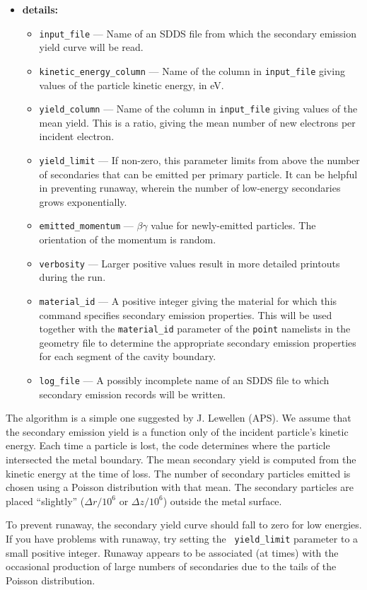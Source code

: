 \begin{itemize}
\item {\bf details:} 
\begin{itemize}
        \item {\tt input\_file} --- Name of an SDDS file from which the secondary emission
        yield curve will be read.
        \item {\tt kinetic\_energy\_column} --- Name of the column in {\tt input\_file} giving
        values of the particle kinetic energy, in eV.  
        \item {\tt yield\_column}  --- Name of the column in {\tt input\_file} giving
        values of the mean yield.  This is a ratio, giving the mean number of new electrons per
        incident electron.
        \item {\tt yield\_limit} --- If non-zero, this parameter limits from above the number
        of secondaries that can be emitted per primary particle. It can be helpful in preventing
        runaway, wherein the number of low-energy secondaries grows exponentially.
        \item {\tt emitted\_momentum} --- $\beta\gamma$ value for newly-emitted particles.
        The orientation of the momentum is random.
        \item {\tt verbosity} --- Larger positive values result in more detailed printouts
        during the run.
        \item {\tt material\_id} --- A positive integer giving the material for which this
          command specifies secondary emission properties. This will be used together with
          the \verb|material_id| parameter of the \verb|point| namelists in the geometry
          file to determine the appropriate secondary emission properties for each segment
          of the cavity boundary.
        \item {\tt log\_file} --- A possibly incomplete name of an SDDS file to which 
         secondary emission records will be written.
\end{itemize}

\end{itemize}

The algorithm is a simple one suggested by J. Lewellen (APS).  We
assume that the secondary emission yield is a function only of the
incident particle's kinetic energy.  Each time a particle is lost, the
code determines where the particle intersected the metal boundary.
The mean secondary yield is computed from the kinetic energy at the
time of loss.  The number of secondary particles emitted is chosen
using a Poisson distribution with that mean.  The secondary particles
are placed ``slightly'' ($\Delta r/10^6$ or $\Delta z/10^6$) outside
the metal surface.

To prevent runaway, the secondary yield curve should fall to zero for
low energies.  If you have problems with runaway, try setting the {\tt
yield\_limit} parameter to a small positive integer.  Runaway
appears to be associated (at times) with the occasional production of
large numbers of secondaries due to the tails of the Poisson
distribution.

